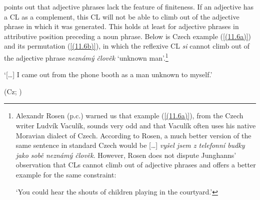 \citet[71]{Junghanns02} points out that adjective phrases lack the feature of finiteness. If an adjective has a CL as a complement, this CL will not be able to climb out of the adjective phrase in which it was generated. This holds at least for adjective phrases in attributive position preceding a noun phrase. Below is  Czech example (\ref{(11.6a)}) and its permutation (\ref{(11.6b)}), in which the reflexive CL \textit{si} cannot climb out of the adjective phrase \textit{neznámý člověk} ‘unknown man’.\footnote{Alexandr
    Rosen (p.c.) warned us that example (\ref{(11.6a)}), from the Czech writer Ludvík Vaculík, sounds very odd and that Vaculík often uses his native Moravian dialect of Czech. According to Rosen, a much better version of the same sentence in standard Czech would be [\dots] \textit{vyšel jsem z telefonní budky jako sobě neznámý člověk}. However, Rosen does not dispute Junghanns’ observation that CLs cannot climb out of adjective phrases and offers a better example for the same constraint:

    \ea
        \z
    \z
    \glt ‘You could hear the shouts of children playing in the courtyard.’
}

\begin{exe}
\ex
\begin{xlist}
\end{xlist}
\glt ‘[\dots] I came out from the phone booth as a man unknown to myself.’ \\
\strut\hfill (Cz; \citealt[71]{Junghanns02})
\end{exe}


